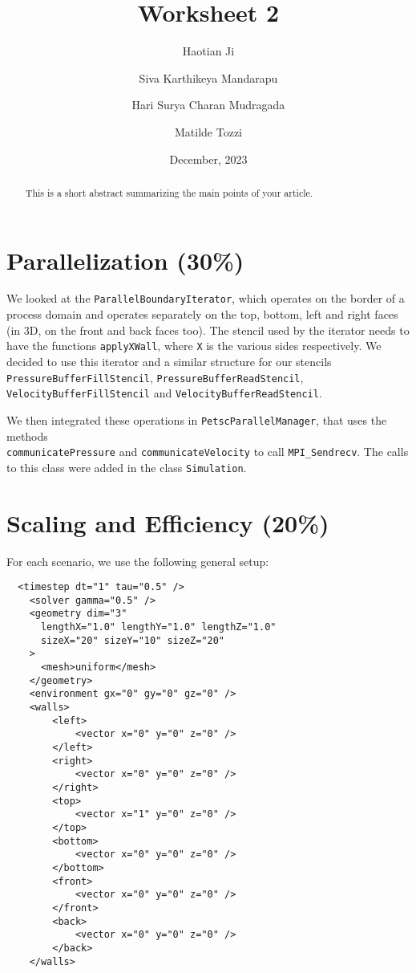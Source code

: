 \documentclass[
  english,        %
  font=palatino,     %
  onecolumn,      %
]{tumarticle}
\title{Worksheet 2}
\author{Haotian Ji}
\author{Siva Karthikeya Mandarapu}
\author{Hari Surya Charan Mudragada}
\author{Matilde Tozzi}
\date{December, 2023}
\begin{document}
\maketitle

\begin{abstract}
  This is a short abstract summarizing the main points of your article.
\end{abstract}

\section{Parallelization (30\%)}


We looked at the \texttt{ParallelBoundaryIterator}, which operates on the border of a process domain and operates separately on the top, bottom, left and right faces (in 3D, on the front and back faces too). The stencil used by the iterator needs to have the functions \texttt{applyXWall}, where \texttt{X} is the various sides respectively. We decided to use this iterator and a similar structure for our stencils \texttt{PressureBufferFillStencil}, \texttt{PressureBufferReadStencil}, \texttt{VelocityBufferFillStencil} and \texttt{VelocityBufferReadStencil}.

We then integrated these operations in \texttt{PetscParallelManager}, that uses the methods \\\texttt{communicatePressure} and \texttt{communicateVelocity} to call \texttt{MPI\_Sendrecv}. The calls to this class were added in the class \texttt{Simulation}.

\section{Scaling and Efficiency (20\%)}

For each scenario, we use the following general setup:

\begin{verbatim}
  <timestep dt="1" tau="0.5" />
    <solver gamma="0.5" />
    <geometry dim="3"
      lengthX="1.0" lengthY="1.0" lengthZ="1.0"
      sizeX="20" sizeY="10" sizeZ="20"
    >
      <mesh>uniform</mesh>
    </geometry>
    <environment gx="0" gy="0" gz="0" />
    <walls>
        <left>
            <vector x="0" y="0" z="0" />
        </left>
        <right>
            <vector x="0" y="0" z="0" />
        </right>
        <top>
            <vector x="1" y="0" z="0" />
        </top>
        <bottom>
            <vector x="0" y="0" z="0" />
        </bottom>
        <front>
            <vector x="0" y="0" z="0" />
        </front>
        <back>
            <vector x="0" y="0" z="0" />
        </back>
    </walls>

\end{verbatim}
\end{document}
